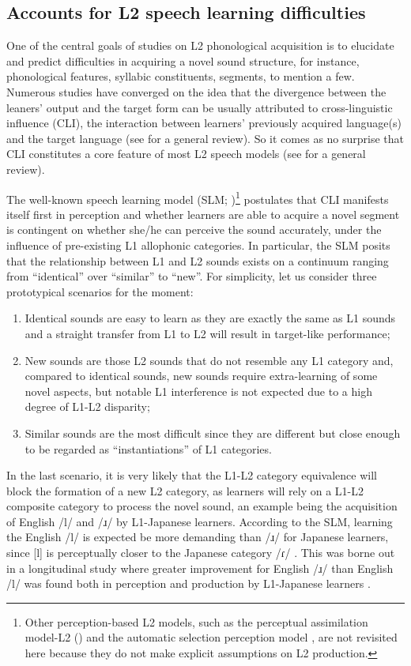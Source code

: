 \documentclass[output=paper]{../langscibook}
\begin{document}
\subsection{Accounts for L2 speech learning difficulties}
\label{sec:zhou:1.2}


One of the central goals of studies on L2 phonological acquisition is to elucidate and predict difficulties in acquiring a novel sound structure, for instance, phonological features, syllabic constituents, segments, to mention a few. Numerous studies have converged on the idea that the divergence between the leaners’ output and the target form can be usually attributed to cross-linguistic influence (CLI), the interaction between learners’ previously acquired language(s) and the target language (see \citealt{Major2008} for a general review). So it comes as no surprise that CLI constitutes a core feature of most L2 speech models (see \citealt{ColantoniEtAl2015} for a general review).

The well-known speech learning model (SLM; \citealt{Flege1995})\footnote{Other perception-based L2 models, such as the perceptual assimilation model-L2 (\citealt{BestTyler2007}) and the automatic selection perception model \citep{Strange2011}, are not revisited here because they do not make explicit assumptions on L2 production.}  postulates that CLI manifests itself first in perception and whether learners are able to acquire a novel segment is contingent on whether she/he can perceive the sound accurately, under the influence of pre-existing L1 allophonic categories. In particular, the SLM posits that the relationship between L1 and L2 sounds exists on a continuum ranging from “identical” over “similar” to “new”. For simplicity, let us consider three prototypical scenarios for the moment: 

\begin{enumerate}[label=(\roman*)]
\item Identical sounds are easy to learn as they are exactly the same as L1 sounds and a straight transfer from L1 to L2 will result in target-like performance; 
\item New sounds are those L2 sounds that do not resemble any L1 category and, compared to identical sounds, new sounds require extra-learning of some novel aspects, but notable L1 interference is not expected due to a high degree of L1-L2 disparity; 
\item Similar sounds are the most difficult since they are different but close enough to be regarded as “instantiations” of L1 categories. 
\end{enumerate}
In the last scenario, it is very likely that the L1-L2 category equivalence will block the formation of a new L2 category, as learners will rely on a L1-L2 composite category to process the novel sound, an example being the acquisition of English /l/ and /ɹ/ by L1-Japanese learners. According to the SLM, learning the English /l/ is expected be more demanding than /ɹ/ for Japanese learners, since [l] is perceptually closer to the Japanese category /ɾ/ \citep{IversonEtAl2001}. This was borne out in a longitudinal study where greater improvement for English /ɹ/ than English /l/ was found both in perception and production by L1-Japanese learners \citep{AoyamaEtAl2004}.
\end{document}
